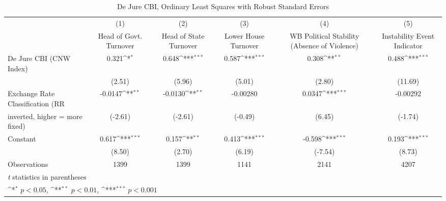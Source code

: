 \begin{table}[htbp]\centering
\def\sym#1{\ifmmode^{#1}\else\(^{#1}\)\fi}
\caption{De Jure CBI, Ordinary Least Squares with Robust Standard Errors \label{multIndOLSDJ}}
\begin{tabular}{l*{5}{c}}
\toprule
                                        &\multicolumn{1}{c}{(1)}&\multicolumn{1}{c}{(2)}&\multicolumn{1}{c}{(3)}&\multicolumn{1}{c}{(4)}&\multicolumn{1}{c}{(5)}\\
                                        &\multicolumn{1}{c}{Head of Govt. Turnover}&\multicolumn{1}{c}{Head of State Turnover}&\multicolumn{1}{c}{Lower House Turnover}&\multicolumn{1}{c}{WB Political Stability (Absence of Violence)}&\multicolumn{1}{c}{Instability Event Indicator}\\
\midrule
De Jure CBI (CNW Index)                 &     0.321\sym{*}  &     0.648\sym{***}&     0.587\sym{***}&     0.308\sym{**} &     0.488\sym{***}\\
                                        &    (2.51)         &    (5.96)         &    (5.01)         &    (2.80)         &   (11.69)         \\
\addlinespace
Exchange Rate Classification (RR        &   -0.0147\sym{**} &   -0.0130\sym{**} &  -0.00280         &    0.0347\sym{***}&  -0.00292         \\
inverted, higher = more fixed)          &   (-2.61)         &   (-2.61)         &   (-0.49)         &    (6.45)         &   (-1.74)         \\
\addlinespace
Constant                                &     0.617\sym{***}&     0.157\sym{**} &     0.413\sym{***}&    -0.598\sym{***}&     0.193\sym{***}\\
                                        &    (8.50)         &    (2.70)         &    (6.19)         &   (-7.54)         &    (8.73)         \\
\midrule
Observations                            &      1399         &      1399         &      1141         &      2141         &      4207         \\
\bottomrule
\multicolumn{6}{l}{\footnotesize \textit{t} statistics in parentheses}\\
\multicolumn{6}{l}{\footnotesize \sym{*} \(p<0.05\), \sym{**} \(p<0.01\), \sym{***} \(p<0.001\)}\\
\end{tabular}
\end{table}
